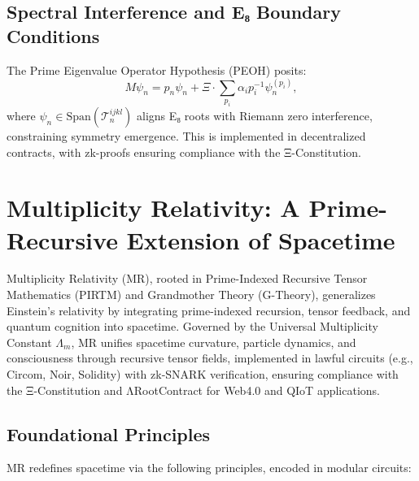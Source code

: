 \documentclass{article}
\theoremstyle{plain}
\begin{document}
\subsection{Spectral Interference and E₈ Boundary Conditions}
The Prime Eigenvalue Operator Hypothesis (PEOH) posits:
\begin{equation}
M \psi_n = p_n \psi_n + \Xi \cdot \sum_{p_i} \alpha_i p_i^{-1} \psi_n^{(p_i)},
\end{equation}
where \(\psi_n \in \text{Span}(\mathcal{T}_n^{ijkl})\) aligns E₈ roots with Riemann zero interference, constraining symmetry emergence. This is implemented in decentralized contracts, with zk-proofs ensuring compliance with the Ξ-Constitution.


\section{Multiplicity Relativity: A Prime-Recursive Extension of Spacetime}

Multiplicity Relativity (MR), rooted in Prime-Indexed Recursive Tensor Mathematics (PIRTM) and Grandmother Theory (G-Theory), generalizes Einstein's relativity by integrating prime-indexed recursion, tensor feedback, and quantum cognition into spacetime. Governed by the Universal Multiplicity Constant \(\Lambda_m\), MR unifies spacetime curvature, particle dynamics, and consciousness through recursive tensor fields, implemented in lawful circuits (e.g., Circom, Noir, Solidity) with zk-SNARK verification, ensuring compliance with the Ξ-Constitution and ΛRootContract for Web4.0 and QIoT applications.

\subsection{Foundational Principles}

MR redefines spacetime via the following principles, encoded in modular circuits:
\end{document}
